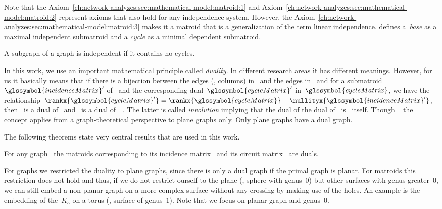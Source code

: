 % 
Note that the Axiom~\ref{ch:network-analyzes:sec:mathematical-model:matroid:1}
and Axiom~\ref{ch:network-analyzes:sec:mathematical-model:matroid:2} represent
axioms that also hold for any independence system. However, the
Axiom~\ref{ch:network-analyzes:sec:mathematical-model:matroid:3} makes it a
matroid that is a generalization of the term linear independence.
% 
\textcite{Whi35} defines a~\emph{base} as a maximal independent submatroid and
a \emph{cycle} as a minimal dependent submatroid. 
%
\begin{definition}
    A subgraph of a graph is independent if it contains no cycles. 
\end{definition}
% 
In this work, we use an important mathematical principle called \emph{duality}.
In different research areas it has different meanings. However, for us it
basically means that if there is a bijection between the edges (\ie, columns)
in~ and the edges in~ and for
a submatroid~$\glssymbol{incidenceMatrix}'$ of~ and
the corresponding dual~$\glssymbol{cycleMatrix}'$ in~$\glssymbol{cycleMatrix}$,
we have the relationship~$\rankx{\glssymbol{cycleMatrix}'} = \rankx{
\glssymbol{cycleMatrix}} - \nullityx{\glssymbol{incidenceMatrix}'}$, 
then~ is a dual of~
and~ is a dual
of~~\parencite[pp.521ff.]{Whi35}. The latter is called
\emph{involution} implying that the dual of the dual
of~ is~ itself. Though
~\parencite[p.522; Theorem~22]{Whi35} the
concept applies from a graph-theoretical perspective to plane graphs only. Only
plane graphs have a dual graph.

The following theorems state very central results that are used in this work.
% 
\begin{theorem}
    For any graph~ the matroids corresponding to its incidence
    matrix~ and its circuit
    matrix~ are duals.
    \label{ch:network-analyzes:sec:mathematical-model:thm:matrix-and-its-circuit-matrix-are-duals}
\end{theorem}
% 
For graphs we restricted the duality to plane graphs, since there is only a dual
graph if the primal graph is planar. For matroids this restriction does not hold
and thus, if we do not restrict ourself to the plane (\ie, sphere with
genus~$0$) but other surfaces with genus greater~$0$, we can still embed a
non-planar graph on a more complex surface without any crossing by making use of
the holes. An example is the embedding of the~$K_5$ on a torus (\ie, surface of
genus~$1$). Note that we focus on planar graph and genus~$0$.
 
